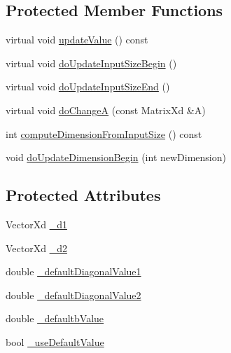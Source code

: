\subsection*{Protected Member Functions}
\begin{DoxyCompactItemize}
\item 
virtual void \hyperlink{classocra_1_1DoubleDiagonalLinearFunction_aee6f818b93d5832a21aa439f13510a49}{update\+Value} () const
\item 
virtual void \hyperlink{classocra_1_1DoubleDiagonalLinearFunction_a91fd529bf34bffd327fcd545035bec67}{do\+Update\+Input\+Size\+Begin} ()
\item 
virtual void \hyperlink{classocra_1_1DoubleDiagonalLinearFunction_a89070f8f2b068d8b6b3e216433e50538}{do\+Update\+Input\+Size\+End} ()
\item 
virtual void \hyperlink{classocra_1_1DoubleDiagonalLinearFunction_a55bd813c1f86402eea01bb403c6257bb}{do\+ChangeA} (const Matrix\+Xd \&A)
\item 
int \hyperlink{classocra_1_1DoubleDiagonalLinearFunction_af449f5bb219672d4f316a0d626436ec8}{compute\+Dimension\+From\+Input\+Size} () const
\item 
void \hyperlink{classocra_1_1DoubleDiagonalLinearFunction_af834599e9b414f8778e0618efc552661}{do\+Update\+Dimension\+Begin} (int new\+Dimension)
\end{DoxyCompactItemize}
\subsection*{Protected Attributes}
\begin{DoxyCompactItemize}
\item 
Vector\+Xd \hyperlink{classocra_1_1DoubleDiagonalLinearFunction_aff7e6eb0c3c53e0799909ab76d279d0a}{\+\_\+d1}
\item 
Vector\+Xd \hyperlink{classocra_1_1DoubleDiagonalLinearFunction_a043b9a5dba8b0d42b00deed8898c1843}{\+\_\+d2}
\item 
double \hyperlink{classocra_1_1DoubleDiagonalLinearFunction_a7e4daebabaa357edeb050b1a2e08868f}{\+\_\+default\+Diagonal\+Value1}
\item 
double \hyperlink{classocra_1_1DoubleDiagonalLinearFunction_ac94bc900b6847f9203adcde9d96c20d9}{\+\_\+default\+Diagonal\+Value2}
\item 
double \hyperlink{classocra_1_1DoubleDiagonalLinearFunction_a24ebbdd1093941e346c6931f23d3193f}{\+\_\+defaultb\+Value}
\item 
bool \hyperlink{classocra_1_1DoubleDiagonalLinearFunction_afbb8120fd4b8bda14ee829c78b6cc817}{\+\_\+use\+Default\+Value}
\end{DoxyCompactItemize}
